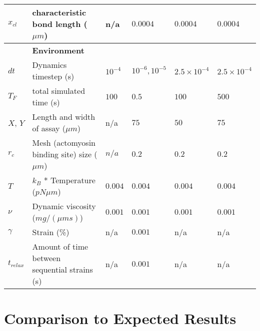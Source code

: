 \documentclass[12pt]{article}
\begin{document}
\begin{table}
\begin{tabular}{|C{1cm}|L{6cm}|C{2cm}|C{2cm}|C{2cm}|C{2cm}|}
    $x_{cl}$& characteristic bond length ($\mu m$) & n/a & $0.0004$ & $0.0004$ & $0.0004$ \\
    \hline
    &\bf{Environment} & & \\
    \hline
    $dt$ & Dynamics timestep (s) & $10^{-4}$ & $10^{-6},10^{-5}$ &$2.5\times10^{-4}$ &$2.5\times10^{-4}$ \\
    $T_F$& total simulated time (s) & $100$ & $0.5$ & $100$ & $500$ \\
    $X$, $Y$ & Length and width of assay ($\mu m$)& n/a & $75$ & $50$ & $75$\\
    $r_c$ & Mesh (actomyosin binding site) size ($\mu m$) & $n/a$ & $0.2 $ & $0.2 $& $0.2 $ \\ 
    $T$ & $k_B$ * Temperature ($pN\mu m$)& $0.004$ & $0.004$& $0.004$& $0.004$\\
    $\nu$ & Dynamic viscosity ($mg/(\mu m s)$) & $0.001$& $0.001$& $0.001$& $0.001$\\
    $\gamma$ & Strain (\%) \cite{stricker2010}& n/a& $0.001$&n/a&n/a\\
    $t_{relax}$ & Amount of time between sequential strains (s)& n/a& $0.001$ &n/a&n/a\\
    \hline
  \end{tabular}
  \label{tab:params}
\end{table}
\section{Comparison to Expected Results}
\end{document}
